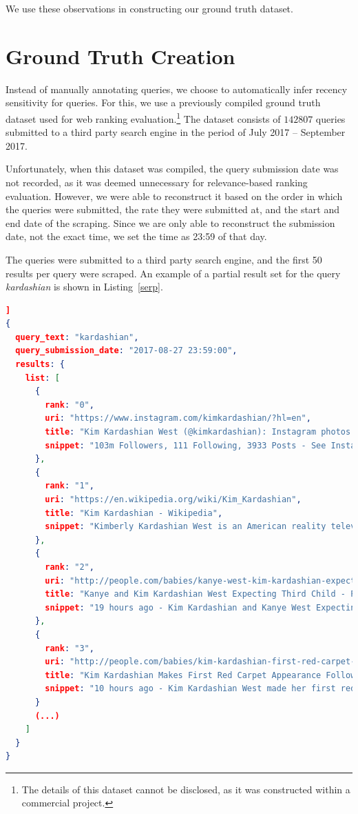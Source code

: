 \noindent We use these observations in constructing our ground truth dataset.

\section{Ground Truth Creation}
Instead of manually annotating queries, we choose to automatically infer recency sensitivity for queries. For this, we use a previously compiled ground truth dataset used for web ranking evaluation.\footnote{The details of this dataset cannot be disclosed, as it was constructed within a commercial project.} The dataset consists of $142807$ queries submitted to a third party search engine in the period of July 2017 -- September 2017.

Unfortunately, when this dataset was compiled, the query submission date was not recorded, as it was deemed unnecessary for relevance-based ranking evaluation. However, we were able to reconstruct it based on the order in which the queries were submitted, the rate they were submitted at, and the start and end date of the scraping. Since we are only able to reconstruct the submission date, not the exact time, we set the time as 23:59 of that day.

The queries were submitted to a third party search engine, and the first 50 results per query were scraped. An example of a partial result set for the query \textit{kardashian} is shown in Listing~\ref{serp}.

\begin{lstlisting}[language=json,firstnumber=1,caption=Example of retrieved results for a query., label=serp]]
{
  query_text: "kardashian",
  query_submission_date: "2017-08-27 23:59:00",
  results: {
    list: [
      {
        rank: "0",
        uri: "https://www.instagram.com/kimkardashian/?hl=en",
        title: "Kim Kardashian West (@kimkardashian): Instagram photos and videos",
        snippet: "103m Followers, 111 Following, 3933 Posts - See Instagram photos and videos from Kim Kardashian West (@kimkardashian)"
      },
      {
        rank: "1",
        uri: "https://en.wikipedia.org/wiki/Kim_Kardashian",
        title: "Kim Kardashian - Wikipedia",
        snippet: "Kimberly Kardashian West is an American reality television personality, socialite, actress, businesswoman and model. Kardashian first gained media attention..."
      },
      {
        rank: "2",
        uri: "http://people.com/babies/kanye-west-kim-kardashian-expecting-third-child-surrogate-pregnant/",
        title: "Kanye and Kim Kardashian West Expecting Third Child - People",
        snippet: "19 hours ago - Kim Kardashian and Kanye West Expecting Baby No. 3 via Surrogate! ..."
      },
      {
        rank: "3",
        uri: "http://people.com/babies/kim-kardashian-first-red-carpet-appearance-baby-number-3/",
        title: "Kim Kardashian Makes First Red Carpet Appearance Following News ...",
        snippet: "10 hours ago - Kim Kardashian West made her first red carpet appearance at New York Fashion Week on Wednesday following the news that she is expecting..."
      }
      (...)
    ]
  }
}
\end{lstlisting}

